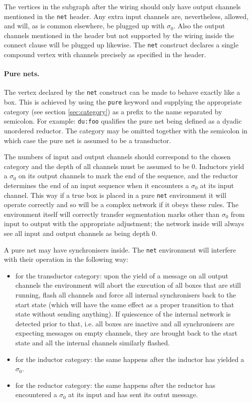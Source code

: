 \documentclass[11pt]{report}
\begin{document}
The vertices in the subgraph after the wiring should only have output channels mentioned in the \verb$net$ header. Any extra input channels are, nevertheless, allowed, and will, as is common elsewhere, be plugged up with $\sigma_0$. Also the output channels mentioned in the header but not supported by the wiring inside the connect clause will be plugged up likewise. The \verb$net$ construct declares a single compound vertex with channels precisely as specified in the header.

\paragraph{Pure nets.} The vertex declared by the \verb$net$ construct can be made to behave exactly like a box. This is achieved by using the \verb$pure$ keyword
and supplying the appropriate category (see section \ref{sec:category}) as a prefix to the name separated by semicolon. For example: \verb$du:foo$ qualifies
the pure net being defined as a dyadic unordered reductor. The category may be omitted together with the semicolon in which case the pure net is assumed to be a
transductor.

The numbers of input and output channels should correspond to the chosen
category and the depth of all channels must be assumed to be 0. Inductors yield a $\sigma_0$ on its output channels to mark the end of the sequence,
and the reductor determines the end of an input sequence when it encounters a $\sigma_0$ at its input channel. This way if a true box is placed in a pure \verb$net$
environment it will operate correctly and so will be a complex network if it obeys these rules. The environment itself will correctly transfer segmentation marks other than $\sigma_0$ from input to output with the appropriate adjustment; the network inside will always see all input and output channels as being depth 0.

A pure net may have synchronisers inside. The \verb$net$ environment will interfere with their operation in the following way:
\begin{itemize}
\item for the transductor category: upon the yield of a message on all output channels the environment will abort the execution of all boxes that are still running,
flash all channels and force all internal synchronisers back to the start state (which will have the same effect as a proper transition to that state without sending anything). If quiescence of the internal network is detected prior to that, i.e. all boxes are inactive and all synchronisers are expecting messages on empty
channels, they are brought back to the start state and all the internal channels similarly flashed.
\item for the inductor category: the same happens after the inductor has yielded a $\sigma_0$.
\item for the reductor category: the same happens after the reductor has encountered a $\sigma_0$ at its input and has sent its outut message.
\end{itemize}
\end{document}
